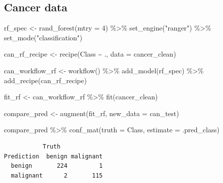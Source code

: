 \documentclass[
  letterpaper,
  DIV=11,
  numbers=noendperiod]{scrreprt}
\newenvironment{Shaded}{\begin{snugshade}}{\end{snugshade}}
\newcommand{\AttributeTok}[1]{\textcolor[rgb]{0.40,0.45,0.13}{#1}}
\newcommand{\DecValTok}[1]{\textcolor[rgb]{0.68,0.00,0.00}{#1}}
\newcommand{\FunctionTok}[1]{\textcolor[rgb]{0.28,0.35,0.67}{#1}}
\newcommand{\NormalTok}[1]{\textcolor[rgb]{0.00,0.23,0.31}{#1}}
\newcommand{\OtherTok}[1]{\textcolor[rgb]{0.00,0.23,0.31}{#1}}
\newcommand{\SpecialCharTok}[1]{\textcolor[rgb]{0.37,0.37,0.37}{#1}}
\newcommand{\StringTok}[1]{\textcolor[rgb]{0.13,0.47,0.30}{#1}}
\begin{document}
\hypertarget{cancer-data}{%
\subsection{Cancer data}\label{cancer-data}}

\begin{Shaded}
\begin{Highlighting}[]
\NormalTok{rf\_spec }\OtherTok{\textless{}{-}} \FunctionTok{rand\_forest}\NormalTok{(}\AttributeTok{mtry =} \DecValTok{4}\NormalTok{) }\SpecialCharTok{\%\textgreater{}\%}
  \FunctionTok{set\_engine}\NormalTok{(}\StringTok{"ranger"}\NormalTok{) }\SpecialCharTok{\%\textgreater{}\%}
  \FunctionTok{set\_mode}\NormalTok{(}\StringTok{"classification"}\NormalTok{)}
\end{Highlighting}
\end{Shaded}

\begin{Shaded}
\begin{Highlighting}[]
\NormalTok{can\_rf\_recipe }\OtherTok{\textless{}{-}} 
  \FunctionTok{recipe}\NormalTok{(Class }\SpecialCharTok{\textasciitilde{}}\NormalTok{ ., }\AttributeTok{data =}\NormalTok{ cancer\_clean) }

\NormalTok{can\_workflow\_rf }\OtherTok{\textless{}{-}} \FunctionTok{workflow}\NormalTok{() }\SpecialCharTok{\%\textgreater{}\%}
  \FunctionTok{add\_model}\NormalTok{(rf\_spec) }\SpecialCharTok{\%\textgreater{}\%}
  \FunctionTok{add\_recipe}\NormalTok{(can\_rf\_recipe)}

\NormalTok{fit\_rf }\OtherTok{\textless{}{-}}\NormalTok{ can\_workflow\_rf  }\SpecialCharTok{\%\textgreater{}\%} 
  \FunctionTok{fit}\NormalTok{(cancer\_clean)}
\end{Highlighting}
\end{Shaded}

\begin{Shaded}
\begin{Highlighting}[]
\NormalTok{compare\_pred }\OtherTok{\textless{}{-}} \FunctionTok{augment}\NormalTok{(fit\_rf, }\AttributeTok{new\_data =}\NormalTok{ can\_test) }

\NormalTok{compare\_pred }\SpecialCharTok{\%\textgreater{}\%} \FunctionTok{conf\_mat}\NormalTok{(}\AttributeTok{truth =}\NormalTok{ Class, }\AttributeTok{estimate =}\NormalTok{ .pred\_class)}
\end{Highlighting}
\end{Shaded}

\begin{verbatim}
           Truth
Prediction  benign malignant
  benign       224         1
  malignant      2       115
\end{verbatim}
\end{document}
